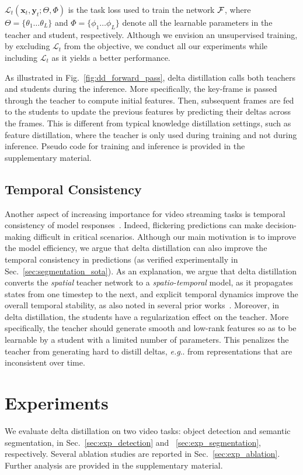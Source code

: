 \documentclass[runningheads]{llncs}
\makeatletter
\def\x{\mathbf{x}}
\def\y{\mathbf{y}}
\def\xt{\x_t}
\def\yt{\y_t}
\def\Ltask{\mathcal{L}_{t}}
\DeclareRobustCommand\onedot{\futurelet\@let@token\@onedot}
\def\@onedot{\ifx\@let@token.\else.\null\fi\xspace}
\def\eg{\emph{e.g}\onedot} \def\Eg{\emph{E.g}\onedot}
\makeatother
\begin{document}
$\Ltask(\xt, \yt;\Theta, \Phi)$ is the task loss used to train the network $\mathcal{F}$, where $\Theta=\{\theta_1 \dots \theta_L\}$ and $\Phi=\{\phi_1 \dots \phi_L\}$ denote all the learnable parameters in the teacher and student, respectively.
Although we envision an unsupervised training, by excluding $\Ltask$ from the objective, we conduct all our experiments while including $\Ltask$ as it yields a better performance.

As illustrated in Fig.~\ref{fig:dd_forward_pass}, delta distillation calls both teachers and students during the inference. More specifically, the key-frame is passed through the teacher to compute initial features. Then,  subsequent frames are fed to the students to update the previous features by predicting their deltas across the frames. This is different from typical knowledge distillation settings, such as feature distillation, where the teacher is only used during training and not during inference.
Pseudo code for training and inference is provided in the supplementary material.
\subsection{Temporal Consistency}
\label{sec:tc}
Another aspect of increasing importance for video streaming tasks is temporal consistency of model responses~\cite{lei2020blind,liu2020efficient,Rebol_2020_ACVRW}. Indeed, flickering predictions can make decision-making difficult in critical scenarios.
Although our main motivation is to improve the model efficiency, we argue that delta distillation can also improve the temporal consistency in predictions (as verified experimentally in Sec.~\ref{sec:segmentation_sota}).
As an explanation, we argue that delta distillation converts the \emph{spatial} teacher network to a \emph{spatio-temporal} model, as it propagates states from one timestep to the next, and explicit temporal dynamics improve the overall temporal stability, as also noted in several prior works~\cite{Rebol_2020_ACVRW,sibechi2019exploiting}.
Moreover, in delta distillation, the students have a regularization effect on the teacher.
More specifically, the teacher should generate smooth and low-rank features so as to be learnable by a student with a limited number of parameters. 
This penalizes the teacher from generating hard to distill deltas, \eg from representations that are inconsistent over time. \section{Experiments}
\label{sec:experiments}
We evaluate delta distillation on two video tasks: object detection and semantic segmentation, in Sec.~\ref{sec:exp_detection} and ~\ref{sec:exp_segmentation}, respectively. Several ablation studies are reported in Sec.~\ref{sec:exp_ablation}. Further analysis are provided in the supplementary material.
\end{document}
